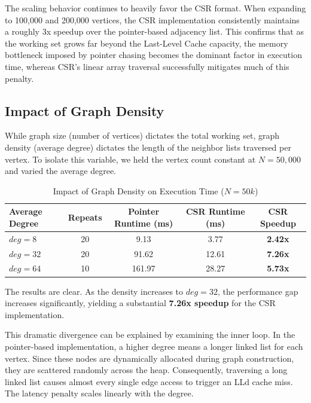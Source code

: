 \documentclass[11pt]{article}
\begin{document}
The scaling behavior continues to heavily favor the CSR format. When expanding to 100,000 and 200,000 vertices, the CSR implementation consistently maintains a roughly 3x speedup over the pointer-based adjacency list. This confirms that as the working set grows far beyond the Last-Level Cache capacity, the memory bottleneck imposed by pointer chasing becomes the dominant factor in execution time, whereas CSR's linear array traversal successfully mitigates much of this penalty.

\subsection{Impact of Graph Density}

While graph size (number of vertices) dictates the total working set, graph density (average degree) dictates the length of the neighbor lists traversed per vertex. To isolate this variable, we held the vertex count constant at $N=50,000$ and varied the average degree.

\begin{table}[H]
\centering
\caption{Impact of Graph Density on Execution Time ($N=50k$)}
\vspace{0.2cm}
\begin{tabular}{@{}lcccc@{}}
\toprule
\textbf{Average Degree} & \textbf{Repeats} & \textbf{Pointer Runtime (ms)} & \textbf{CSR Runtime (ms)} & \textbf{CSR Speedup} \\ \midrule
$deg=8$  & 20 & 9.13 & 3.77 & \textbf{2.42x} \\
$deg=32$ & 20 & 91.62 & 12.61 & \textbf{7.26x} \\
$deg=64$ & 10 & 161.97 & 28.27 & \textbf{5.73x} \\ \bottomrule
\end{tabular}
\end{table}

The results are clear. As the density increases to $deg=32$, the performance gap increases significantly, yielding a substantial \textbf{7.26x speedup} for the CSR implementation. 

This dramatic divergence can be explained by examining the inner loop. In the pointer-based implementation, a higher degree means a longer linked list for each vertex. Since these nodes are dynamically allocated during graph construction, they are scattered randomly across the heap. Consequently, traversing a long linked list causes almost every single edge access to trigger an LLd cache miss. The latency penalty scales linearly with the degree. 
\end{document}
